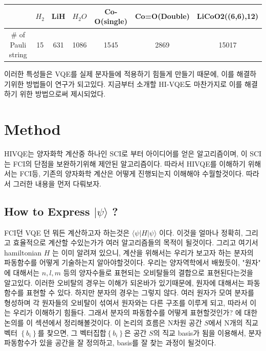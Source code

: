 \documentclass[10pt]{article}
\begin{document}
\begin{enumerate}[label=3)]
% 
\begin{center}
\begin{tabular}{@{}ccccccc@{}}
\toprule
                   & \(H_2\) & LiH & \(H_2O\) & Co-O(single) & Co=O(Double) & LiCoO2((6,6),12)          \\ \midrule
\# of Pauli string & 15   & 631 & 1086  & 1545         & 2869         & \multicolumn{1}{c}{15017} \\ \bottomrule
\end{tabular}
\end{center}

이러한 특성들은 VQE를 실제 분자들에 적용하기 힘들게 만들기 때문에, 이를 해결하기위한 방법들이 연구가 되고있다. 지금부터 소개할 HI-VQE도 마찬가지로 이를 해결하기 위한 방법으로써 제시되었다.
\end{enumerate}
\newpage

\section{Method}
HIVQE는 양자화학 계산중 하나인 SCI로 부터 아이디어를 얻은 알고리즘이며, 이 SCI는 FCI의 단점을 보완하기위해 제안된 알고리즘이다. 
따라서 HIVQE를 이해하기 위해서는 FCI등, 기존의 양자화학 계산은 어떻게 진행되는지 이해해야 수월할것이다. 따라서 그러한 내용을 먼저 다뤄보자. 

\subsection{How to Express \(|\psi \rangle\) ?}
FCI던 VQE 던 뭐든 계산하고자 하는것은 \(\langle \psi|H|\psi \rangle\) 이다. 이것을 얼마나 정확히,
그리고 효율적으로 계산할 수있는가가 여러 알고리즘들의 목적이 될것이다. 그리고 여기서 hamiltonian \(H\) 는 이미 알려져 있으니, 계산을 위해서는 우리가 보고자 하는 분자의 파동함수를 어떻게 기술하는지 알아야할것이다.
우리는 양자역학에서 배웠듯이, "원자" 에 대해서는 \(n,l,m\) 등의 양자수들로 표현되는 오비탈들의 결합으로 표현된다는것을 알고있다.
이러한 오비탈의 경우는 이해가 되온바가 있기때문에, 원자에 대해서는 파동함수를 표현할 수 있다. 하지만 분자의 경우는 그렇지 않다. 
여러 원자가 모여 분자를 형성하며 각 원자들의 오비탈이 섞여서 원자와는 다른 구조를 이루게 되고, 따라서 이는 우리가 이해하기 힘들다. 
그래서 분자의 파동함수를 어떻게 표현할것인가? 에 대한 논의를 이 섹션에서 정리해볼것이다.
이 논리의 흐름은 N차원 공간 \(S\)에서 N개의 직교벡터 \(\left\{b_i\right\}\)를 찾으면, 그 벡터집합\(\left\{b_i\right\}\)은 공간 \(S\)의 직교 basis가 됨을 이용해서, 
분자 파동함수가 있을 공간을 잘 정의하고, basis를 잘 찾는 과정이 될것이다. 
\end{document}
